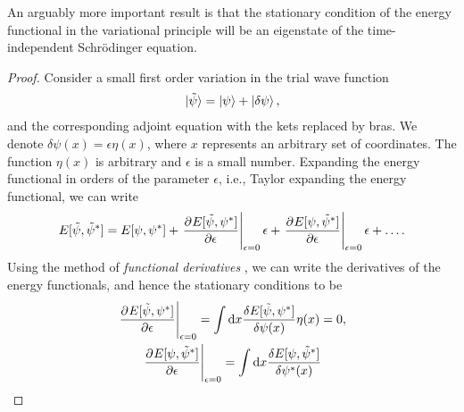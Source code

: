         An arguably more important result is that the stationary condition of
        the energy functional in the variational principle will be an eigenstate
        of the time-independent Schrödinger equation.
        \begin{proof}
            Consider a small first order variation in the trial wave function
            \begin{align}
                \ket*{\tilde{\psi}} = \ket{\psi} + \ket{\delta\psi},
                \label{eq:wave-variation}
            \end{align}
            and the corresponding adjoint equation with the kets replaced by bras.
            We denote $\delta\psi(x) = \epsilon\eta(x)$, where $x$ represents an
            arbitrary set of coordinates.
            The function $\eta(x)$ is arbitrary and $\epsilon$ is a small
            number.
            Expanding the energy functional in orders of the parameter
            $\epsilon$, i.e., Taylor expanding the energy functional, we can
            write
            \begin{align}
                E[\tilde{\psi}, \tilde{\psi}^{*}]
                = E[\psi, \psi^{*}]
                + \left.
                \dpd{E[\tilde{\psi}, \psi^{*}]}{\epsilon}
                \right\rvert_{\epsilon = 0}
                \epsilon
                + \left.
                \dpd{E[\psi, \tilde{\psi}^{*}]}{\epsilon}
                \right\rvert_{\epsilon = 0}
                \epsilon
                + \dots.
            \end{align}
            Using the method of \emph{functional derivatives}
            \cite{wiki:functional-derivative, kvaal2017notes}, we can write
            the derivatives of the energy functionals, and hence the stationary
            conditions to be
            \begin{gather}
                \left.
                \dpd{E[\tilde{\psi}, \psi^{*}]}{\epsilon}
                \right\rvert_{\epsilon = 0}
                =
                \int\dd x \frac{
                    \delta E[\tilde{\psi}, \psi^{*}]
                }{
                    \delta \psi(x)
                }
                \eta(x)
                = 0,
                \\
                \left.
                \dpd{E[\psi, \tilde{\psi}^{*}]}{\epsilon}
                \right\rvert_{\epsilon = 0}
                =
                \int\dd x \frac{
                    \delta E[\psi, \tilde{\psi}^{*}]
                }{
                    \delta
                    \psi^{*}(x)
}
\end{gather}
\end{proof}
